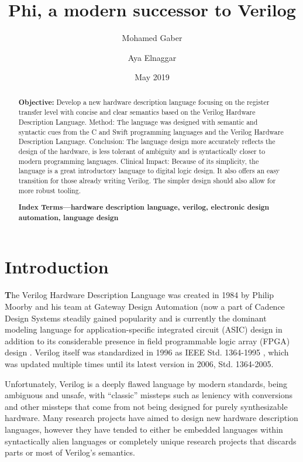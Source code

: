 \documentclass[10pt, two column]{article}
\title{\huge Phi, a modern successor to Verilog}
\author{Mohamed Gaber \and Aya Elnaggar}
\date{May 2019}
\theoremstyle{definition}
\begin{document}
\onecolumn
\maketitle
\begin{abstract}
\textbf{Objective:} Develop a new hardware description language focusing on the register transfer level with concise and clear semantics based on the Verilog Hardware Description Language. Method: The language was designed with semantic and syntactic cues from the C and Swift programming languages and the Verilog Hardware Description Language. Conclusion: The language design more accurately reflects the design of the hardware, is less tolerant of ambiguity and is syntactically closer to modern programming languages. Clinical Impact: Because of its simplicity, the language is a great introductory language to digital logic design. It also offers an easy transition for those already writing Verilog. The simpler design should also allow for more robust tooling.\newline
     
\textbf{Index Terms—hardware description language, verilog, electronic design automation, language design}

\end{abstract}

\tableofcontents
\newpage
\twocolumn

\section{Introduction}
{\huge\textbf T}he Verilog Hardware Description Language was created in 1984 by Philip Moorby and his team at Gateway Design Automation (now a part of Cadence Design Systems \cite{threeDecadesofHDL} steadily gained popularity and is currently the dominant modeling language for application-specific integrated circuit (ASIC) design in addition to its considerable presence in field programmable logic array (FPGA) design \cite{foster_2016}. Verilog itself was standardized in 1996 as IEEE Std. 1364-1995 \cite{IEEEstandardHDLbasedonVer_1996}, which was updated multiple times until its latest version in 2006, Std. 1364-2005\cite{IEEEstandardforVerilogHDL_2006}. 
\newline

Unfortunately, Verilog is a deeply flawed language by modern standards, being ambiguous and unsafe, with “classic” missteps such as leniency with conversions and other missteps that come from not being designed for purely synthesizable hardware. Many research projects have aimed to design new hardware description languages, however they have tended to either be embedded languages within syntactically alien languages or completely unique research projects that discards parts or most of Verilog’s semantics.\newline
\end{document}
